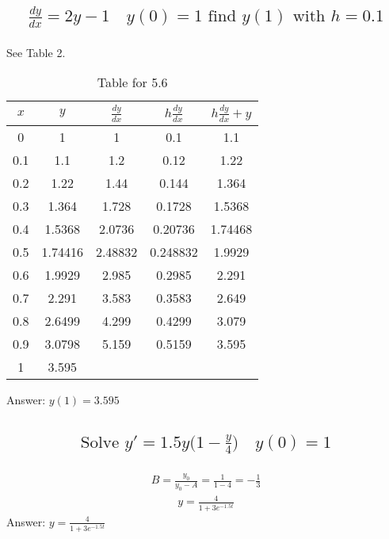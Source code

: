 \documentclass{article}
\begin{document}
\subsection{
	\begin{align*}
		\frac{dy}{dx} = 2y - 1 \quad y(0) = 1 \text{ find } y(1) \text{ with } h = 0.1
	\end{align*}
}
See Table 2. \\[10pt]
\begin{table}[h!]
\centering
\begin{tabular}{|c|c|c|c|c|}
\hline
$x$ & $y$ & $\frac{dy}{dx}$ & $h\frac{dy}{dx}$ & $h\frac{dy}{dx} + y$ \\ \hline
0 	& 1		 	& 1			& 0.1			& 1.1			\\ \hline
0.1 	& 1.1 		& 1.2			& 0.12		& 1.22		\\ \hline
0.2 	& 1.22	 	& 1.44		& 0.144		& 1.364		\\ \hline
0.3 	& 1.364 		& 1.728		& 0.1728		& 1.5368		\\ \hline
0.4 	& 1.5368		& 2.0736		& 0.20736		& 1.74468		\\ \hline
0.5 	& 1.74416		& 2.48832		& 0.248832	& 1.9929		\\ \hline
0.6 	& 1.9929		& 2.985		& 0.2985		& 2.291		\\ \hline
0.7 	& 2.291		& 3.583		& 0.3583		& 2.649		\\ \hline
0.8 	& 2.6499		& 4.299		& 0.4299		& 3.079		\\ \hline
0.9 	& 3.0798		& 5.159		& 0.5159		& 3.595		\\ \hline
1 	& 3.595
\end{tabular}
\caption{Table for 5.6}
\end{table}
Answer: $y(1) = 3.595$

\subsection{
	\begin{align*}
		\text{Solve } y' = 1.5y\bigg( 1 - \frac{y}{4} \bigg) \quad y(0) = 1
	\end{align*}
}
\begin{align*}
	B = \frac{y_0}{y_0 - A} = \frac{1}{1 - 4} = -\frac{1}{3}
\end{align*}
\begin{align*}
	y = \frac{4}{1 + 3e^{-1.5t}}
\end{align*}
Answer: $y = \frac{4}{1 + 3e^{-1.5t}}$

\end{document}
